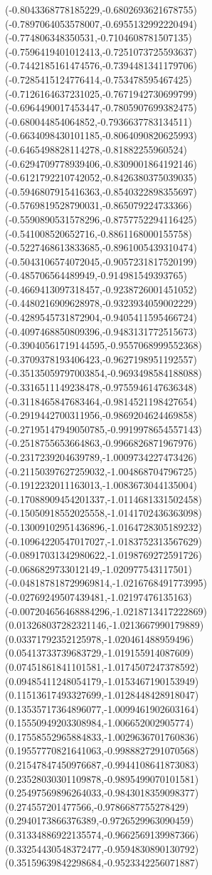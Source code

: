 {(-0.8043368778185229,-0.6802693621678755)
(-0.7897064053578007,-0.6955132992220494)
(-0.774806348350531,-0.7104608781507135)
(-0.7596419401012413,-0.7251073725593637)
(-0.7442185161474576,-0.7394481341179706)
(-0.7285415124776414,-0.753478595467425)
(-0.7126164637231025,-0.7671942730699799)
(-0.6964490017453447,-0.7805907699382475)
(-0.680044854064852,-0.7936637783134511)
(-0.6634098430101185,-0.8064090820625993)
(-0.6465498828114278,-0.81882255960524)
(-0.6294709778939406,-0.8309001864192146)
(-0.6121792210742052,-0.8426380375039035)
(-0.5946807915416363,-0.8540322898355697)
(-0.5769819528790031,-0.865079224733366)
(-0.5590890531578296,-0.8757752294116425)
(-0.541008520652716,-0.8861168000155758)
(-0.5227468613833685,-0.8961005439310474)
(-0.5043106574072045,-0.9057231817520199)
(-0.485706564489949,-0.914981549393765)
(-0.4669413097318457,-0.9238726001451052)
(-0.4480216909628978,-0.9323934059002229)
(-0.4289545731872904,-0.9405411595466724)
(-0.4097468850809396,-0.9483131772515673)
(-0.39040561719144595,-0.9557068999552368)
(-0.3709378193406423,-0.9627198951192557)
(-0.35135059797003854,-0.9693498584188088)
(-0.3316511149238478,-0.9755946147636348)
(-0.3118465847683464,-0.9814521198427654)
(-0.2919442700311956,-0.9869204624469858)
(-0.27195147949050785,-0.9919978654557143)
(-0.2518755653664863,-0.9966826871967976)
(-0.2317239204639789,-1.0009734227473426)
(-0.21150397627259032,-1.004868704796725)
(-0.1912232011163013,-1.0083673044135004)
(-0.17088909454201337,-1.0114681331502458)
(-0.15050918552025558,-1.0141702436363098)
(-0.13009102951436896,-1.0164728305189232)
(-0.10964220547017027,-1.0183752313567629)
(-0.08917031342980622,-1.0198769272591726)
(-0.0686829733012149,-1.020977543117501)
(-0.048187818729969814,-1.0216768491773995)
(-0.02769249507439481,-1.02197476135163)
(-0.007204656468884296,-1.0218713417222869)
(0.013268037282321146,-1.0213667990179889)
(0.03371792352125978,-1.020461488959496)
(0.05413733739683729,-1.019155914087609)
(0.07451861841101581,-1.0174507247378592)
(0.09485411248054179,-1.0153467190153949)
(0.11513617493327699,-1.0128448428918047)
(0.13535717364896077,-1.0099461902603164)
(0.15550949203308984,-1.006652002905774)
(0.17558552965884833,-1.0029636701760836)
(0.19557770821641063,-0.9988827291070568)
(0.21547847450976687,-0.9944108641873083)
(0.23528030301109878,-0.9895499070101581)
(0.25497569896264033,-0.9843018359098377)
(0.274557201477566,-0.9786687755278429)
(0.2940173866376389,-0.9726529963090459)
(0.31334886922135574,-0.9662569139987366)
(0.33254430548372477,-0.9594830890130792)
(0.35159639842298684,-0.9523342256071887)
}
